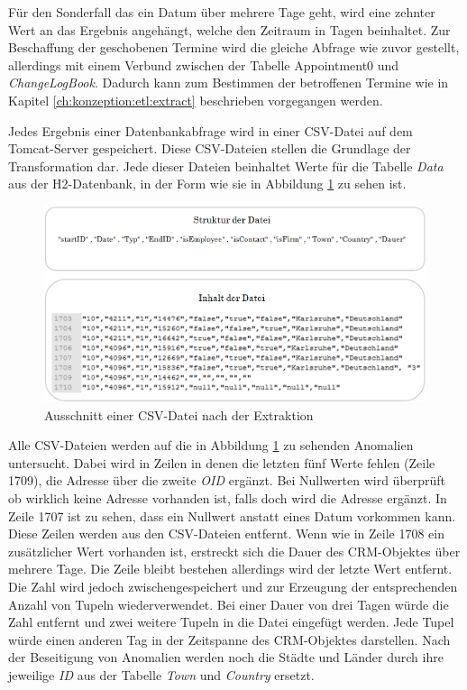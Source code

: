 Für den Sonderfall das ein Datum über mehrere Tage geht, wird eine zehnter Wert an das Ergebnis angehängt, welche den Zeitraum in Tagen beinhaltet. Zur Beschaffung der geschobenen Termine wird die gleiche Abfrage wie zuvor gestellt, allerdings mit einem Verbund zwischen der Tabelle Appointment0 und \textit{ChangeLogBook}. Dadurch kann zum Bestimmen der betroffenen Termine wie in Kapitel \ref{ch:konzeption:etl:extract} beschrieben vorgegangen werden.

Jedes Ergebnis einer Datenbankabfrage wird in einer CSV-Datei auf dem Tomcat-Server gespeichert. Diese CSV-Dateien stellen die Grundlage der Transformation dar. Jede dieser Dateien beinhaltet Werte für die Tabelle \textit{Data} aus der H2-Datenbank, in der Form wie sie in Abbildung \ref{fig:umsetzung_csv_datei} zu sehen ist. 

\begin{figure}[htbp]
\begin{center}
\includegraphics[width=1.0\textwidth]{pics/umsetzung_csv_datei.png}
\caption{Ausschnitt einer CSV-Datei nach der Extraktion}
\label{fig:umsetzung_csv_datei}
\end{center}
\end{figure}

Alle CSV-Dateien werden auf die in Abbildung \ref{fig:umsetzung_csv_datei} zu sehenden Anomalien untersucht. Dabei wird in Zeilen in denen die letzten fünf Werte fehlen (Zeile 1709), die Adresse über die zweite \textit{OID} ergänzt. Bei Nullwerten wird überprüft ob wirklich keine Adresse vorhanden ist, falls doch wird die Adresse ergänzt. In Zeile 1707 ist zu sehen, dass ein Nullwert anstatt eines Datum vorkommen kann. Diese Zeilen werden aus den CSV-Dateien entfernt. Wenn wie in Zeile 1708 ein zusätzlicher Wert vorhanden ist, erstreckt sich die Dauer des CRM-Objektes über mehrere Tage. Die Zeile bleibt bestehen allerdings wird der letzte Wert entfernt. Die Zahl wird jedoch zwischengespeichert und zur Erzeugung der entsprechenden Anzahl von Tupeln wiederverwendet. Bei einer Dauer von drei Tagen würde die Zahl entfernt und zwei weitere Tupeln in die Datei eingefügt werden. Jede Tupel würde einen anderen Tag in der Zeitspanne des CRM-Objektes darstellen. Nach der Beseitigung von Anomalien werden noch die Städte und Länder durch ihre jeweilige \textit{ID} aus der Tabelle \textit{Town} und \textit{Country} ersetzt.

